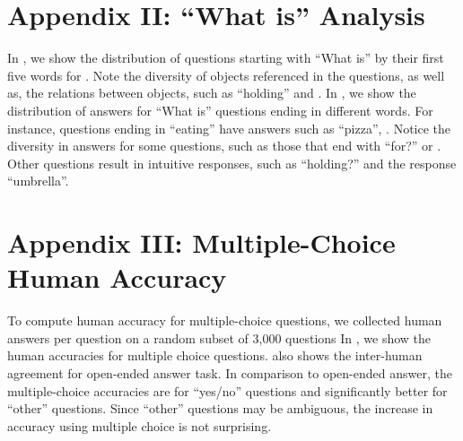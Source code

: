 \section*{Appendix II: ``What is'' Analysis}
\label{sec:what_is}

In , we show the distribution of questions starting with ``What is'' by their first five words for . Note the diversity of objects referenced in the questions, as well as, the relations between objects, such as ``holding'' and . In , we show the distribution of answers for ``What is'' questions ending in different words. For instance, questions ending in ``eating'' have answers such as ``pizza'',  . Notice the diversity in answers for some questions, such as those that end with ``for?'' or . Other questions result in intuitive responses, such as ``holding?'' and the response ``umbrella''.

\section*{Appendix III: Multiple-Choice Human Accuracy}
\label{sec:human_mc}

To compute human accuracy for multiple-choice questions, we collected  human answers per question on a random subset of 3,000 questions  In , we show the human accuracies for multiple choice questions.  also shows the inter-human agreement for open-ended answer task. In comparison to open-ended answer, the multiple-choice accuracies are %
for ``yes/no'' questions and significantly better  for ``other'' questions. Since ``other'' questions may be ambiguous, the increase in accuracy using multiple choice is not surprising. 

